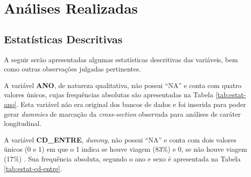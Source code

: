 \chapter{Análises Realizadas}\label{chap:analises}

\section{Estatísticas Descritivas}\label{sec:bd-estat-descr}

A seguir serão apresentadas algumas estatísticas descritivas das variáveis, bem como outras observações julgadas pertinentes.

A variável \textbf{ANO}, de natureza qualitativa, não possui ``NA'' e conta com quatro valores únicos, cujas frequências absolutas são apresentadas na Tabela \ref{tab:estat-ano}. Esta variável não era original dos bancos de dados e foi inserida para poder gerar \textit{dummies} de marcação da \textit{cross-section} observada para análises de caráter longitudinal.

\begin{table}[htb]

\end{table}

A variável \textbf{CD_ENTRE}, \textit{dummy}, não possui ``NA'' e conta com dois valores únicos (0 e 1) em que o 1 indica se houve viagem (83\%) e 0, se não houve viagem (17\%) . Sua frequência absoluta, segundo o ano e sexo é apresentada na Tabela \ref{tab:estat-cd-entre}.

